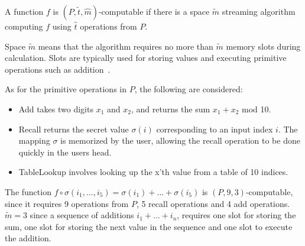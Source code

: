 \begin{definition}
    \label{ptm-computable}
    A function $f$ is $(P, \tilde t, \hat m)$-computable if there is a space $\tilde m$ streaming algorithm computing $f$ using $\hat t$ operations from $P$.
\end{definition}
\begin{remark}
    Space $\tilde m$ means that the algorithm requires no more than $\tilde m$ memory slots during calculation. Slots are typically used for storing values and executing primitive operations such as addition~\cite{space-complexity}.
\end{remark}



\noindent As for the primitive operations in $P$, the following are considered:
\begin{itemize}
    \item{Add} takes two digits $x_1$ and $x_2$, and returns the sum $x_1 + x_2$ mod 10.
    \item{Recall} returns the secret value $\sigma(i)$ corresponding to an input index $i$. The mapping $\sigma$ is memorized by the user, allowing the recall operation to be done quickly in the users head.
    \item{TableLookup} involves looking up the x'th value from a table of 10 indices.
\end{itemize}

\begin{example}
    The function $f \circ \sigma(i_1,\dots,i_5) = \sigma(i_1) + \dots + \sigma(i_5)$ is $(P,9,3)$-computable, since it requires 9 operations from $P$, 5 recall operations and 4 add operations. $\tilde m=3$ since a sequence of additions $i_1 + \dots + i_n$, requires one slot for storing the sum, one slot for storing the next value in the sequence and one slot to execute the addition.
\end{example}


